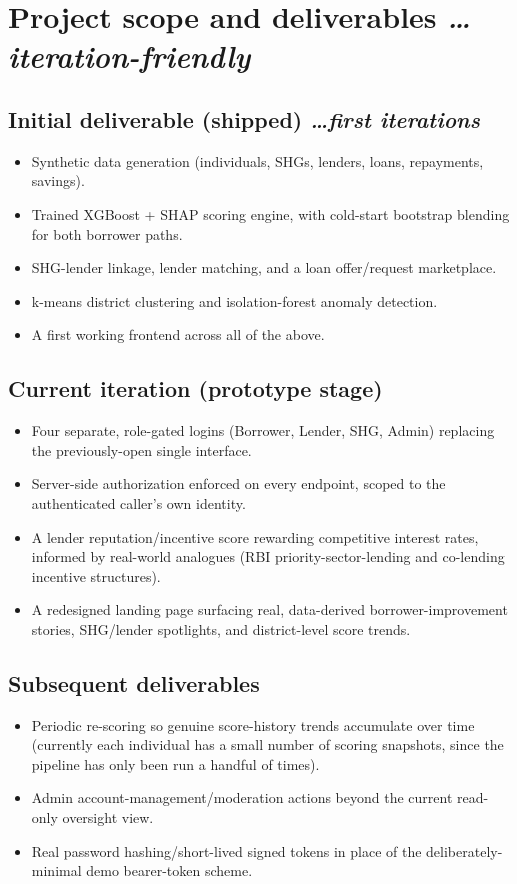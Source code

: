 \documentclass[11pt,a4paper]{article}
\newcommand{\BvrHint}[1]{%
  {\normalfont\normalsize\itshape\hfill #1}}
\begin{document}
\section{Project scope and deliverables %
\BvrHint{\ldots iteration-friendly}}
\subsection{Initial deliverable (shipped) %
\BvrHint{\ldots first iterations}}
\begin{itemize}[leftmargin=0.7cm]
    \item Synthetic data generation (individuals, SHGs,
    lenders, loans, repayments, savings).
    \item Trained XGBoost + SHAP scoring engine, with
    cold-start bootstrap blending for both borrower paths.
    \item SHG-lender linkage, lender matching, and a loan
    offer/request marketplace.
    \item k-means district clustering and isolation-forest
    anomaly detection.
    \item A first working frontend across all of the above.
\end{itemize}

\subsection{Current iteration (prototype stage)}
\begin{itemize}[leftmargin=0.7cm]
    \item Four separate, role-gated logins (Borrower,
    Lender, SHG, Admin) replacing the previously-open
    single interface.
    \item Server-side authorization enforced on every
    endpoint, scoped to the authenticated caller's own
    identity.
    \item A lender reputation/incentive score rewarding
    competitive interest rates, informed by real-world
    analogues (RBI priority-sector-lending and co-lending
    incentive structures).
    \item A redesigned landing page surfacing real,
    data-derived borrower-improvement stories, SHG/lender
    spotlights, and district-level score trends.
\end{itemize}

\subsection{Subsequent deliverables}
\begin{itemize}[leftmargin=0.7cm]
    \item Periodic re-scoring so genuine score-history
    trends accumulate over time (currently each individual
    has a small number of scoring snapshots, since the
    pipeline has only been run a handful of times).
    \item Admin account-management/moderation actions
    beyond the current read-only oversight view.
    \item Real password hashing/short-lived signed tokens
    in place of the deliberately-minimal demo bearer-token
    scheme.
\end{itemize}
\end{document}
